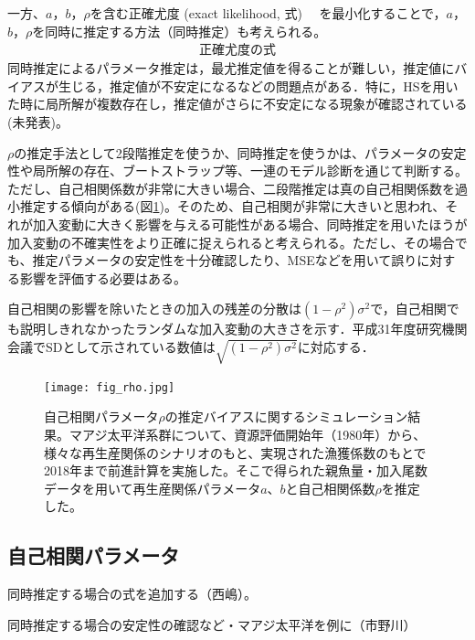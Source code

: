 \documentclass[11pt]{jsarticle}
\begin{document}
一方、$a$，$b$，$\rho$を含む正確尤度 (exact likelihood, 式\cite{subsec:rho})　%
を最小化することで，$a$，$b$，$\rho$を同時に推定する方法（同時推定）も考えられる。
\begin{eqnarray}
  正確尤度の式
  \label{rho_eq}
\end{eqnarray}
同時推定によるパラメータ推定は，最尤推定値を得ることが難しい，推定値にバイアスが生じる，推定値が不安定になるなどの問題点がある\cite{johnson}．特に，HSを用いた時に局所解が複数存在し，推定値がさらに不安定になる現象が確認されている(未発表)。

$\rho$の推定手法として2段階推定を使うか、同時推定を使うかは、パラメータの安定性や局所解の存在、ブートストラップ等、一連のモデル診断を通じて判断する。ただし、自己相関係数が非常に大きい場合、二段階推定は真の自己相関係数を過小推定する傾向がある(図\ref{fig_rho})。そのため、自己相関が非常に大きいと思われ、それが加入変動に大きく影響を与える可能性がある場合、同時推定を用いたほうが加入変動の不確実性をより正確に捉えられると考えられる。ただし、その場合でも、推定パラメータの安定性を十分確認したり、MSEなどを用いて誤りに対する影響を評価する必要はある。

自己相関の影響を除いたときの加入の残差の分散は$(1-\rho^2) \sigma^2$で，自己相関でも説明しきれなかったランダムな加入変動の大きさを示す．平成31年度研究機関会議でSDとして示されている数値は$\sqrt{(1-\rho^2) \sigma^2}$に対応する．

\begin{figure}[t]
  \texttt{[image: fig\_rho.jpg]}
  \caption{自己相関パラメータ$\rho$の推定バイアスに関するシミュレーション結果。マアジ太平洋系群について、資源評価開始年（1980年）から、様々な再生産関係のシナリオのもと、実現された漁獲係数のもとで2018年まで前進計算を実施した。そこで得られた親魚量・加入尾数データを用いて再生産関係パラメータ$a$、$b$と自己相関係数$\rho$を推定した。}
  \label{fig_rho}
\end{figure}

\subsection{自己相関パラメータ\label{subsec:rho}}

同時推定する場合の式を追加する（西嶋）。

同時推定する場合の安定性の確認など・マアジ太平洋を例に（市野川）
\end{document}
